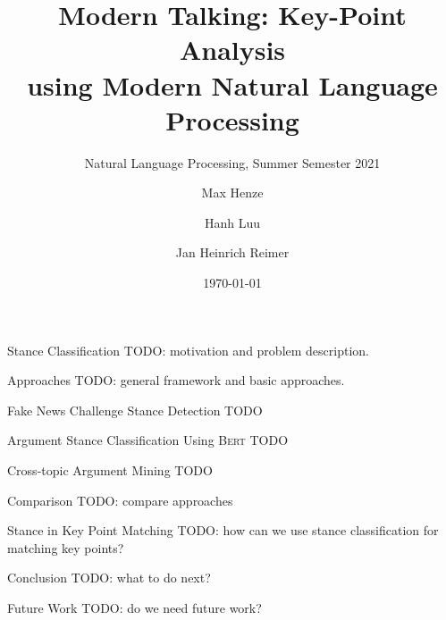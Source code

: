 \documentclass[english,handout]{mlutalk}
\title{%
  Modern Talking: Key-Point Analysis \\
  using Modern Natural Language Processing
}
\subtitle{Natural Language Processing, Summer Semester 2021}
\author{Max Henze \and Hanh Luu \and Jan Heinrich Reimer}
\institute{Martin Luther University Halle-Wittenberg}
\date{\today}
\newcommand{\Bert}{\textsc{Bert}\xspace}
\begin{document}
\titleframe

\begin{frame}{Stance Classification}
  TODO: motivation and problem description.
\end{frame}

\begin{frame}{Approaches}
  TODO: general framework and basic approaches.
\end{frame}

\begin{frame}{Fake News Challenge Stance Detection}
  TODO
\end{frame}

\begin{frame}{Argument Stance Classification Using \Bert}
  TODO
\end{frame}

\begin{frame}{Cross-topic Argument Mining}
  TODO
\end{frame}

\begin{frame}{Comparison}
  TODO: compare approaches
\end{frame}

\begin{frame}{Stance in Key Point Matching}
  TODO: how can we use stance classification for matching key points?
\end{frame}

\begin{frame}{Conclusion}
  TODO: what to do next?
\end{frame}

\begin{frame}{Future Work}
  TODO: do we need future work?
  \thankyou
\end{frame}

\appendix
\section{\appendixname}

\bibliographyframe
\end{document}
